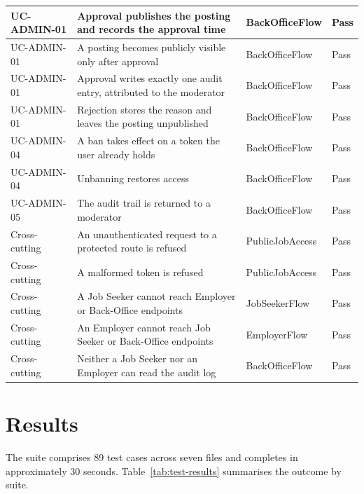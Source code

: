 \begin{longtable}{|>{\raggedright\arraybackslash}p{2.0cm}|>{\raggedright\arraybackslash}p{5.7cm}|>{\raggedright\arraybackslash}p{4.6cm}|>{\raggedright\arraybackslash}p{1.4cm}|}
	\hline
	UC-ADMIN-01 & Approval publishes the posting and records the approval time & BackOfficeFlow & Pass \\
	\hline
	UC-ADMIN-01 & A posting becomes publicly visible only after approval & BackOfficeFlow & Pass \\
	\hline
	UC-ADMIN-01 & Approval writes exactly one audit entry, attributed to the moderator & BackOfficeFlow & Pass \\
	\hline
	UC-ADMIN-01 & Rejection stores the reason and leaves the posting unpublished & BackOfficeFlow & Pass \\
	\hline
	UC-ADMIN-04 & A ban takes effect on a token the user already holds & BackOfficeFlow & Pass \\
	\hline
	UC-ADMIN-04 & Unbanning restores access & BackOfficeFlow & Pass \\
	\hline
	UC-ADMIN-05 & The audit trail is returned to a moderator & BackOfficeFlow & Pass \\
	\hline
	Cross-cutting & An unauthenticated request to a protected route is refused & PublicJobAccess & Pass \\
	\hline
	Cross-cutting & A malformed token is refused & PublicJobAccess & Pass \\
	\hline
	Cross-cutting & A Job Seeker cannot reach Employer or Back-Office endpoints & JobSeekerFlow & Pass \\
	\hline
	Cross-cutting & An Employer cannot reach Job Seeker or Back-Office endpoints & EmployerFlow & Pass \\
	\hline
	Cross-cutting & Neither a Job Seeker nor an Employer can read the audit log & BackOfficeFlow & Pass \\
	\hline
\end{longtable}

\section{Results}

The suite comprises 89 test cases across seven files and completes in approximately 30 seconds. Table~\ref{tab:test-results} summarises the outcome by suite.

